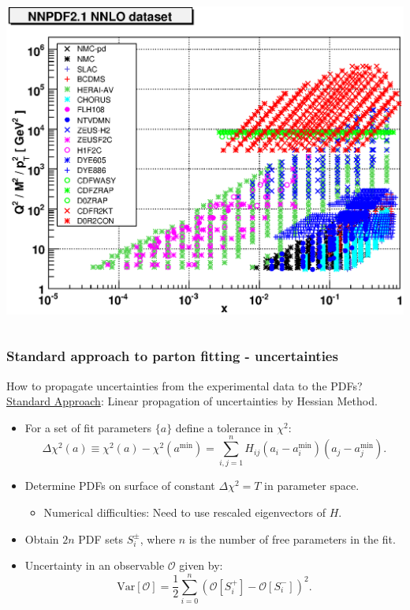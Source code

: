 \documentclass[10pt]{beamer}
\newcommand{\be}{\begin{equation*}}
\newcommand{\ee}{\end{equation*}}
\newcommand{\vso}{\vskip15pt}
\begin{document}
\begin{frame}
\begin{columns}
\begin{column}{0.7\textwidth}
\includegraphics[width=\textwidth]{kin21nnlo.eps}
\end{column}


\end{columns}



\end{frame}


\begin{frame}
\frametitle{Standard approach to parton fitting - uncertainties}
How to propagate uncertainties from the experimental data to the PDFs?
\underline{Standard Approach}: Linear propagation of uncertainties by Hessian Method.
\begin{itemize}
		\item<1->For a set of fit parameters $\{ a\} $ define a tolerance in $\chi^2$:
		\be \Delta\chi^2(a) \equiv \chi^2(a) - \chi^2(a^\mathrm{min}) = \sum^n_{i,j=1}H_{ij}(a_i-a_i^\mathrm{min})(a_j - a_j^\mathrm{min}). \ee
		\item<1-> Determine PDFs on surface of constant $\Delta\chi^2=T$ in parameter space.
		\begin{itemize}
			\item<1-> Numerical difficulties: Need to use rescaled eigenvectors of $H$.
		\end{itemize}
		\item<1-> Obtain $2n$ PDF sets $S_i^\pm$, where $n$ is the number of free parameters in the fit. \vso
		\item<1-> Uncertainty in an observable $\mathcal{O}$ given by:
		\be \mathrm{Var}[\mathcal{O}] = \frac{1}{2}\sum_{i=0}^n (\mathcal{O}[S_i^+] - \mathcal{O}[S_i^-] )^2.\ee
\end{itemize}

\end{frame}
\end{document}
